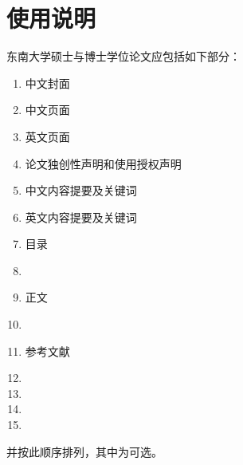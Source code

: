 \documentclass[figurelist,tablelist,algorithmlist,nomlist,masters]{seuthesix}
\begin{document}
\chapter{使用说明}
东南大学硕士与博士学位论文应包括如下部分：\\
\begin{enumerate}
\itshape
\item 中文封面
\item 中文页面
\item 英文页面
\item 论文独创性声明和使用授权声明
\item 中文内容提要及关键词
\item 英文内容提要及关键词
\item 目录
\item {}
\item 正文
\item {}
\item 参考文献
\item  {}
\item {}
\item  {}
\item {}
\end{enumerate}
并按此顺序排列，其中为可选。
\end{document}
